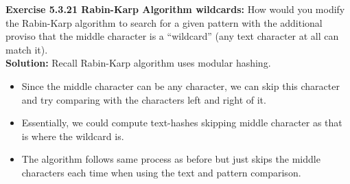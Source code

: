 \documentclass[11pt,fleqn]{article}
\begin{document}
\textbf{Exercise 5.3.21 Rabin-Karp Algorithm wildcards:} How would you modify the Rabin-Karp algorithm to search for a given pattern
with the additional proviso that the middle character is a “wildcard” (any text character at all can match it).\\

\textbf{Solution:} Recall Rabin-Karp algorithm uses modular hashing.

\begin{itemize}
	\item Since the middle character can be any character, we can skip this character and try comparing with the characters left and right of it.
	
	\item Essentially, we could compute text-hashes skipping middle character as that is where the wildcard is.
	
	\item The algorithm follows same process as before but just skips the middle characters each time when using the text and pattern comparison.
\end{itemize}
\end{document}
